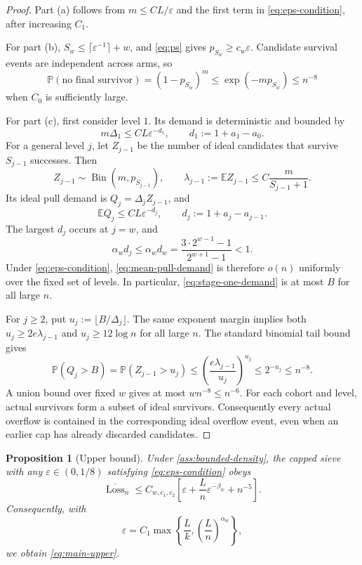 \documentclass[11pt,letterpaper]{article}
\numberwithin{equation}{section}
\newtheorem{proposition}[proposition]{Proposition}
\theoremstyle{definition}
\theoremstyle{remark}
\newcommand{\E}{\mathbb{E}}
\newcommand{\Pp}{\mathbb{P}}
\newcommand{\1}{\mathbf{1}}
\newcommand{\Loss}{\operatorname{Loss}}
\newcommand{\eps}{\varepsilon}
\newcommand{\Bin}{\operatorname{Bin}}
\begin{document}
\begin{proof}
Part (a) follows from $m\le C L/\eps$ and the first term in
\cref{eq:eps-condition}, after increasing $C_1$.

For part (b), $S_w\le\lceil\eps^{-1}\rceil+w$, and
\cref{eq:ps} gives $p_{S_w}\ge c_w\eps$.  Candidate survival events are
independent across arms, so
\[
  \Pp(\text{no final survivor})
  =(1-p_{S_w})^m
  \le \exp(-mp_{S_w})
  \le n^{-8}
\]
when $C_0$ is sufficiently large.

For part (c), first consider level $1$.  Its demand is deterministic and bounded
by
\begin{equation}\label{eq:stage-one-demand}
  m\Delta_1
  \le C L\eps^{-d_1},
  \qquad d_1:=1+a_1-a_0.
\end{equation}
For a general level $j$, let $Z_{j-1}$ be the number of ideal candidates that
survive $S_{j-1}$ successes.  Then
\[
  Z_{j-1}\sim\Bin(m,p_{S_{j-1}}),
  \qquad
  \lambda_{j-1}:=\E Z_{j-1}
  \le C\frac{m}{S_{j-1}+1}.
\]
Its ideal pull demand is $Q_j=\Delta_jZ_{j-1}$, and
\begin{equation}\label{eq:mean-pull-demand}
  \E Q_j
  \le C L\eps^{-d_j},
  \qquad
  d_j:=1+a_j-a_{j-1}.
\end{equation}
The largest $d_j$ occurs at $j=w$, and
\begin{equation}\label{eq:capacity-margin}
  \alpha_w d_j
  \le \alpha_w d_w
  =\frac{3\cdot2^{w-1}-1}{2^{w+1}-1}
  <1.
\end{equation}
Under \cref{eq:eps-condition}, \cref{eq:mean-pull-demand} is therefore
$o(n)$ uniformly over the fixed set of levels.  In particular,
\cref{eq:stage-one-demand} is at most $B$ for all large $n$.

For $j\ge2$, put $u_j:=\lfloor B/\Delta_j\rfloor$.  The same exponent margin
implies both $u_j\ge 2e\lambda_{j-1}$ and $u_j\ge 12\log n$ for all large $n$.
The standard binomial tail bound gives
\[
  \Pp(Q_j>B)
  =\Pp(Z_{j-1}>u_j)
  \le\left(\frac{e\lambda_{j-1}}{u_j}\right)^{u_j}
  \le 2^{-u_j}
  \le n^{-8}.
\]
A union bound over fixed $w$ gives at most $wn^{-8}\le n^{-6}$.
For each cohort and level, actual survivors form a subset of ideal survivors.
Consequently every actual overflow is contained in the corresponding ideal
overflow event, even when an earlier cap has already discarded candidates.
\end{proof}

\begin{proposition}[Upper bound]\label{prop:upper}
Under \cref{ass:bounded-density}, the capped sieve with any
$\eps\in(0,1/8)$ satisfying \cref{eq:eps-condition} obeys
\begin{equation}\label{eq:upper-eps}
  \overline{\Loss}_n
  \le C_{w,c_1,c_2}\left[
      \eps+\frac{L}{n}\eps^{-\beta_w}+n^{-5}
  \right].
\end{equation}
Consequently, with
\begin{equation}\label{eq:eps-choice}
  \eps=C_1\max\left\{\frac{L}{k},
       \left(\frac{L}{n}\right)^{\alpha_w}\right\},
\end{equation}
we obtain \cref{eq:main-upper}.
\end{proposition}
\end{document}
